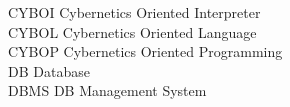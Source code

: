 \begin{tabbing}






    \>CYBOI \>\>Cybernetics Oriented Interpreter\\

    \>CYBOL \>\>Cybernetics Oriented Language\\


    \>CYBOP \>\>Cybernetics Oriented Programming\\









    \>DB \>\>Database\\


    \>DBMS \>\>DB Management System\\



\end{tabbing}
